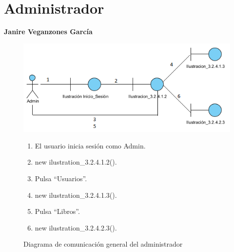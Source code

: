 ﻿\documentclass{report}
\begin{document}
        \section{Administrador}
            \textbf{Janire Veganzones García}
            \begin{figure}[H]
                \centering
                \includegraphics[width=1.0\textwidth]{img/comunicacion/Diagrama1.png}
                \caption{Diagrama de comunicación general del administrador}
            \clearpage
            \begin{enumerate}
                \item El usuario inicia sesión como Admin.
                \item new ilustration\_3.2.4.1.2().
                \item Pulsa ``Usuarios''.
                \item new ilustration\_3.2.4.1.3().
                \item Pulsa ``Libros''.
                \item new ilustration\_3.2.4.2.3().
            \end{enumerate}
            \end{figure}
            \clearpage
\end{document}
